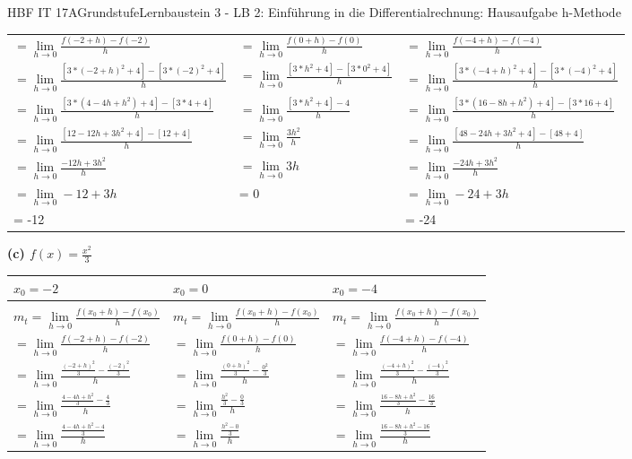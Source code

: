 \documentclass[oneside,openany,headings=optiontotoc,11pt,numbers=noenddot]{scrreprt}
\begin{document}
\begin{worksheet}{HBF IT 17A}{Grundstufe}{Lernbaustein 3 - LB 2: Einführung in die Differentialrechnung: Hausaufgabe h-Methode}
\begin{framed}
\begin{tabularx}{\textwidth}{X|X|X}
				\(=\lim\limits_{h \to 0} \frac{f(-2+h)-f(-2)}{h}\) & \(=\lim\limits_{h \to 0} \frac{f(0+h)-f(0)}{h}\) & \(=\lim\limits_{h \to 0} \frac{f(-4+h)-f(-4)}{h}\)\\
				\(=\lim\limits_{h \to 0} \frac{[3*(-2+h)^2 + 4] - [3*(-2)^2 + 4]}{h}\) & \(=\lim\limits_{h \to 0} \frac{[3*h^2 + 4] - [3*0^2+4]}{h}\) & \(=\lim\limits_{h \to 0} \frac{[3*(-4+h)^2 + 4] - [3*(-4)^2 + 4]}{h}\)\\
				\(=\lim\limits_{h \to 0} \frac{[3*(4 -4h+h^2) +4] -[3*4+4]}{h}\) & \(=\lim\limits_{h \to 0} \frac{[3*h^2 + 4] - 4}{h}\) & \(=\lim\limits_{h \to 0} \frac{[3*(16-8h+h^2)+4] -[3*16+4]}{h}\)\\
				\(=\lim\limits_{h \to 0}\frac{[12-12h+3h^2+4] -[12+4]}{h}\) & \(=\lim\limits_{h \to 0}\frac{3h^2}{h}\) & \(=\lim\limits_{h \to 0}\frac{[48-24h+3h^2+4] -[48+4]}{h}\)\\
				\(=\lim\limits_{h \to 0} \frac{-12h +3h^2}{h}\) & \(=\lim\limits_{h \to 0} 3h\) & \(=\lim\limits_{h \to 0} \frac{-24h +3h^2}{h}\)\\
				\(=\lim\limits_{h \to 0} -12+3h\) & = 0 & \(=\lim\limits_{h \to 0} -24+3h\)\\
				= -12 & & = -24
			\end{tabularx}
			\textbf{(c) \(f(x) = \frac{x^2}{3}\)}\\			
			\begin{tabularx}{\textwidth}{X|X|X}
				\(x_0 = -2\) & \(x_0 = 0\) & \(x_0=-4\)\\
				\hline
				\\
				\(m_{t} = \lim\limits_{h \to 0} \frac{f(x_{0}+h) - f(x_0)}{h}\) & \(m_{t} = \lim\limits_{h \to 0} \frac{f(x_{0}+h) - f(x_0)}{h}\) & \(m_{t} = \lim\limits_{h \to 0} \frac{f(x_{0}+h) - f(x_0)}{h}\)\\
				\(=\lim\limits_{h \to 0} \frac{f(-2+h)-f(-2)}{h}\) & \(=\lim\limits_{h \to 0} \frac{f(0+h)-f(0)}{h}\) & \(=\lim\limits_{h \to 0} \frac{f(-4+h)-f(-4)}{h}\)\\
				\(=\lim\limits_{h \to 0} \frac{\frac{(-2+h)^2}{3}-\frac{(-2)^2}{3}}{h}\) & \(=\lim\limits_{h \to 0} \frac{\frac{(0+h)^2}{3}-\frac{0^2}{3}}{h}\) & \(=\lim\limits_{h \to 0} \frac{\frac{(-4+h)^2}{3}-\frac{(-4)^2}{3}}{h}\)\\
				\(=\lim\limits_{h \to 0}\frac{\frac{4-4h+h^2}{3}-\frac{4}{3}}{h}\) & \(=\lim\limits_{h \to 0}\frac{\frac{h^2}{3}-\frac{0}{3}}{h}\) & \(=\lim\limits_{h \to 0}\frac{\frac{16-8h+h^2}{3}-\frac{16}{3}}{h}\)\\
				\(=\lim\limits_{h \to 0}\frac{\frac{4-4h+h^2-4}{3}}{h}\) & \(=\lim\limits_{h \to 0}\frac{\frac{h^2-0}{3}}{h}\) & \(=\lim\limits_{h \to 0}\frac{\frac{16-8h+h^2-16}{3}}{h}\)\\

\end{tabularx}
\end{framed}
\end{worksheet}
\end{document}
